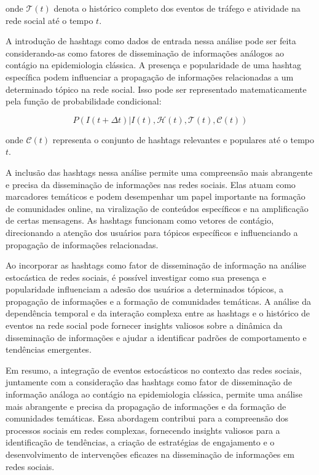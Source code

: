 onde $\mathcal{T}(t)$ denota o histórico completo dos eventos de tráfego e atividade na rede social até o tempo $t$.

A introdução de hashtags como dados de entrada nessa análise pode ser feita considerando-as como fatores de disseminação de informações análogos ao contágio na epidemiologia clássica. A presença e popularidade de uma hashtag específica podem influenciar a propagação de informações relacionadas a um determinado tópico na rede social. Isso pode ser representado matematicamente pela função de probabilidade condicional:

\begin{equation}
P(I(t+\Delta t)|I(t), \mathcal{H}(t), \mathcal{T}(t), \mathcal{C}(t))
\end{equation}

onde $\mathcal{C}(t)$ representa o conjunto de hashtags relevantes e populares até o tempo $t$.

A inclusão das hashtags nessa análise permite uma compreensão mais abrangente e precisa da disseminação de informações nas redes sociais. Elas atuam como marcadores temáticos e podem desempenhar um papel importante na formação de comunidades online, na viralização de conteúdos específicos e na amplificação de certas mensagens. As hashtags funcionam como vetores de contágio, direcionando a atenção dos usuários para tópicos específicos e influenciando a propagação de informações relacionadas.

Ao incorporar as hashtags como fator de disseminação de informação na análise estocástica de redes sociais, é possível investigar como sua presença e popularidade influenciam a adesão dos usuários a determinados tópicos, a propagação de informações e a formação de comunidades temáticas. A análise da dependência temporal e da interação complexa entre as hashtags e o histórico de eventos na rede social pode fornecer insights valiosos sobre a dinâmica da disseminação de informações e ajudar a identificar padrões de comportamento e tendências emergentes.

Em resumo, a integração de eventos estocásticos no contexto das redes sociais, juntamente com a consideração das hashtags como fator de disseminação de informação análoga ao contágio na epidemiologia clássica, permite uma análise mais abrangente e precisa da propagação de informações e da formação de comunidades temáticas. Essa abordagem contribui para a compreensão dos processos sociais em redes complexas, fornecendo insights valiosos para a identificação de tendências, a criação de estratégias de engajamento e o desenvolvimento de intervenções eficazes na disseminação de informações em redes sociais.

